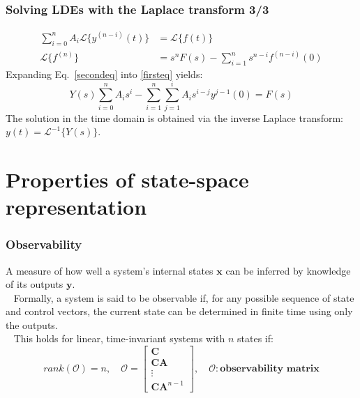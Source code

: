 \begin{frame}
\frametitle{Solving LDEs with the Laplace transform 3/3}
\begin{align}
\sum_{i=0}^{n} A_i \mathcal{L}\{y^{(n-i)}(t)\} &= \mathcal{L}\{f(t)\}  \label{firsteq} \\
\mathcal{L}\{f^{(n)}\} &= s^n F(s) - \sum_{i=1}^n s^{n-i}f^{(n-i)}(0) \label{secondeq}
\end{align}
\pause
Expanding Eq.~\eqref{secondeq} into \eqref{firsteq} yields:
\begin{equation*}
Y(s)\sum_{i=0}^n A_i s^i - \sum_{i=1}^n \sum_{j=1}^i A_i s^{i-j}y^{j-1}(0) = F(s)
\end{equation*}
\pause
The solution in the time domain is obtained via the inverse Laplace transform: $y(t) = \mathcal{L}^{-1}\{Y(s)\}$.
\end{frame}


\section{Properties of state-space representation}

\begin{frame}
\frametitle{Observability}
A measure of how well a system's internal states $\mathbf{x}$ can be inferred by knowledge of its outputs $\mathbf{y}$. \\
\pause
\ \newline
Formally, a system is said to be observable if, for any possible sequence of state and control vectors, the current state can be determined in finite time using only the outputs. \\
\ \newline
\pause
This holds for linear, time-invariant systems with $n$ states if:
\begin{equation*}
rank(\mathcal{O}) = n,\quad \mathcal{O} = \begin{bmatrix} \mathbf{C} \\ \mathbf{CA} \\ \vdots \\ \mathbf{CA}^{n-1} \end{bmatrix}, \quad \mathcal{O}: \textbf{observability matrix}
\end{equation*}

\end{frame}


